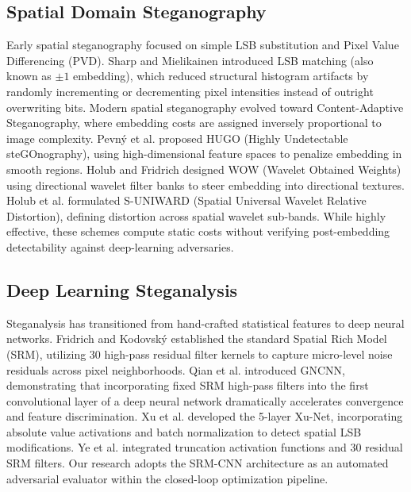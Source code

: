 \documentclass[conference]{IEEEtran}
\begin{document}
\subsection{Spatial Domain Steganography}
Early spatial steganography focused on simple LSB substitution and Pixel Value Differencing (PVD). Sharp \cite{sharp2001information} and Mielikainen \cite{mielikainen2006lsb} introduced LSB matching (also known as $\pm 1$ embedding), which reduced structural histogram artifacts by randomly incrementing or decrementing pixel intensities instead of outright overwriting bits. Modern spatial steganography evolved toward Content-Adaptive Steganography, where embedding costs are assigned inversely proportional to image complexity. Pevn{\'y} et al. \cite{pevny2010using} proposed HUGO (Highly Undetectable steGOnography), using high-dimensional feature spaces to penalize embedding in smooth regions. Holub and Fridrich \cite{holub2012designing} designed WOW (Wavelet Obtained Weights) using directional wavelet filter banks to steer embedding into directional textures. Holub et al. \cite{holub2014universal} formulated S-UNIWARD (Spatial Universal Wavelet Relative Distortion), defining distortion across spatial wavelet sub-bands. While highly effective, these schemes compute static costs without verifying post-embedding detectability against deep-learning adversaries.

\subsection{Deep Learning Steganalysis}
Steganalysis has transitioned from hand-crafted statistical features to deep neural networks. Fridrich and Kodovsk{\'y} \cite{fridrich2012rich} established the standard Spatial Rich Model (SRM), utilizing 30 high-pass residual filter kernels to capture micro-level noise residuals across pixel neighborhoods. Qian et al. \cite{qian2015deep} introduced GNCNN, demonstrating that incorporating fixed SRM high-pass filters into the first convolutional layer of a deep neural network dramatically accelerates convergence and feature discrimination. Xu et al. \cite{xu2016structural} developed the 5-layer Xu-Net, incorporating absolute value activations and batch normalization to detect spatial LSB modifications. Ye et al. \cite{ye2017deep} integrated truncation activation functions and 30 residual SRM filters. Our research adopts the SRM-CNN architecture as an automated adversarial evaluator within the closed-loop optimization pipeline.
\end{document}

